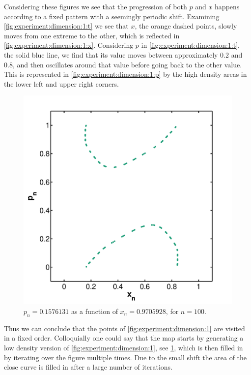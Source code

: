 Considering these figures we see that the progression of both $p$ and $x$ happens according to a fixed pattern with a seemingly periodic shift. Examining \cref{fig:experiment:dimension:1:t} we see that $x$, the orange dashed points, slowly moves from one extreme to the other, which is reflected in \cref{fig:experiment:dimension:1:x}. Considering $p$ in \cref{fig:experiment:dimension:1:t}, the solid blue line, we find that its value moves between approximately 0.2 and 0.8, and then oscillates around that value before going back to the other value. This is represented in \cref{fig:experiment:dimension:1:p} by the high density areas in the lower left and upper right corners.

\begin{figure}
	\centering
	\includegraphics[width=0.9\columnwidth]{./img/assignment_a_1_dim_n100}
	\caption{$p_n = \num{0.1576131}$ as a function of $x_n= \num{0.9705928}$, for $n = 100$.}
	\label{fig:experiment:a_1_n100}
\end{figure}

Thus we can conclude that the points of \cref{fig:experiment:dimension:1} are visited in a fixed order. Colloquially one could say that the map starts by generating a low density version of \cref{fig:experiment:dimension:1}, see \cref{fig:experiment:a_1_n100}, which is then filled in by iterating over the figure multiple times. Due to the small shift the area of the close curve is filled in after a large number of iterations.

